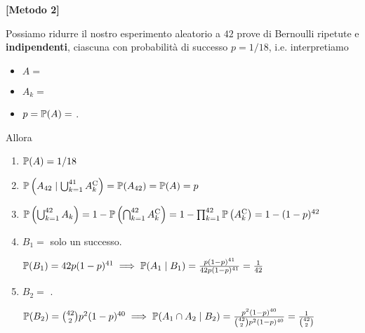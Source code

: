 \textbf{[Metodo 2]}

Possiamo ridurre il nostro esperimento aleatorio a $42$ prove di Bernoulli ripetute e \textbf{indipendenti}, ciascuna con probabilità di successo $p=1/18$, i.e. interpretiamo
\begin{itemize}
	\item $A=$ 
	\item $A_{k} =$ 
	\item $p=\mathbb{P}(A) =$ .
\end{itemize}
Allora
\begin{enumerate}
	\item $\mathbb{P}(A) =1/18$
	\item $\mathbb{P}\left(A_{42} \mid \bigcup _{k=1}^{41} A_{k}^{\mathrm{C}}\right) =\mathbb{P}(A_{42}) =\mathbb{P}(A) =p$
	\item $\mathbb{P}\left(\bigcup _{k=1}^{42} A_{k}\right) =1-\mathbb{P}\left(\bigcap _{k=1}^{42} A_{k}^{\mathrm{C}}\right) =1-\prod _{k=1}^{42}\mathbb{P}\left(A_{k}^{\mathrm{C}}\right) =1-(1-p)^{42}$
	\item $B_{1} =$ solo un successo.

	$\mathbb{P}(B_{1}) =42p(1-p)^{41} \implies \mathbb{P}(A_{1} \mid B_{1}) =\frac{p(1-p)^{41}}{42p(1-p)^{41}} =\frac{1}{42}$
	\item $B_{2} =$ .

	$\mathbb{P}(B_{2}) =\binom{42}{2} p^{2}(1-p)^{40} \implies \mathbb{P}(A_{1} \cap A_{2} \mid B_{2}) =\frac{p^{2}(1-p)^{40}}{\binom{42}{2} p^{2}(1-p)^{40}} =\frac{1}{\binom{42}{2}}$
\end{enumerate}

\Soluzione

